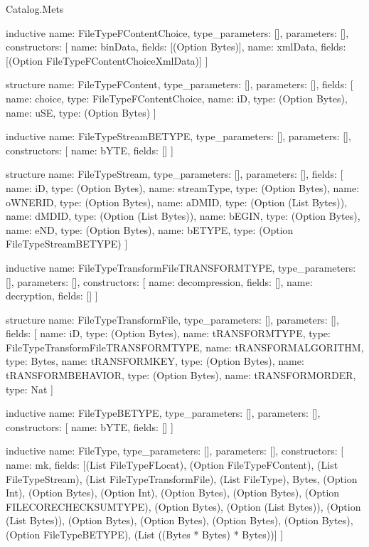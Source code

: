 \begin{lexlean}{Catalog.Mets}
\begin{semanticmodule}
inductive{
  name: FileTypeFContentChoice,
  type_parameters: [],
  parameters: [],
  constructors: [
    {name: binData, fields: [(Option Bytes)]},
    {name: xmlData, fields: [(Option FileTypeFContentChoiceXmlData)]}
  ]
}

structure{
  name: FileTypeFContent,
  type_parameters: [],
  parameters: [],
  fields: [
    {name: choice, type: FileTypeFContentChoice},
    {name: iD, type: (Option Bytes)},
    {name: uSE, type: (Option Bytes)}
  ]
}

inductive{
  name: FileTypeStreamBETYPE,
  type_parameters: [],
  parameters: [],
  constructors: [
    {name: bYTE, fields: []}
  ]
}

structure{
  name: FileTypeStream,
  type_parameters: [],
  parameters: [],
  fields: [
    {name: iD, type: (Option Bytes)},
    {name: streamType, type: (Option Bytes)},
    {name: oWNERID, type: (Option Bytes)},
    {name: aDMID, type: (Option (List Bytes))},
    {name: dMDID, type: (Option (List Bytes))},
    {name: bEGIN, type: (Option Bytes)},
    {name: eND, type: (Option Bytes)},
    {name: bETYPE, type: (Option FileTypeStreamBETYPE)}
  ]
}

inductive{
  name: FileTypeTransformFileTRANSFORMTYPE,
  type_parameters: [],
  parameters: [],
  constructors: [
    {name: decompression, fields: []},
    {name: decryption, fields: []}
  ]
}

structure{
  name: FileTypeTransformFile,
  type_parameters: [],
  parameters: [],
  fields: [
    {name: iD, type: (Option Bytes)},
    {name: tRANSFORMTYPE, type: FileTypeTransformFileTRANSFORMTYPE},
    {name: tRANSFORMALGORITHM, type: Bytes},
    {name: tRANSFORMKEY, type: (Option Bytes)},
    {name: tRANSFORMBEHAVIOR, type: (Option Bytes)},
    {name: tRANSFORMORDER, type: Nat}
  ]
}

inductive{
  name: FileTypeBETYPE,
  type_parameters: [],
  parameters: [],
  constructors: [
    {name: bYTE, fields: []}
  ]
}

inductive{
  name: FileType,
  type_parameters: [],
  parameters: [],
  constructors: [
    {name: mk, fields: [(List FileTypeFLocat), (Option FileTypeFContent), (List FileTypeStream), (List FileTypeTransformFile), (List FileType), Bytes, (Option Int), (Option Bytes), (Option Int), (Option Bytes), (Option Bytes), (Option FILECORECHECKSUMTYPE), (Option Bytes), (Option (List Bytes)), (Option (List Bytes)), (Option Bytes), (Option Bytes), (Option Bytes), (Option Bytes), (Option FileTypeBETYPE), (List ((Bytes * Bytes) * Bytes))]}
  ]
}


\end{semanticmodule}
\end{lexlean}
